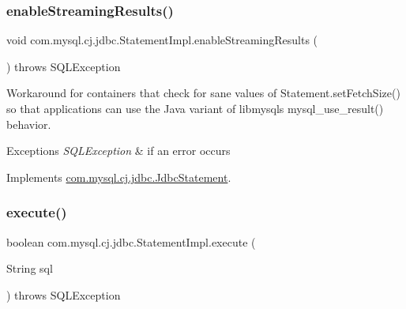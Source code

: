 \mbox{\label{classcom_1_1mysql_1_1cj_1_1jdbc_1_1_statement_impl_a973ff5045e258a5c3e156887c116c976}} 
\subsubsection{\texorpdfstring{enable\+Streaming\+Results()}{enableStreamingResults()}}
{\footnotesize\ttfamily void com.\+mysql.\+cj.\+jdbc.\+Statement\+Impl.\+enable\+Streaming\+Results (\begin{DoxyParamCaption}{ }\end{DoxyParamCaption}) throws S\+Q\+L\+Exception}

Workaround for containers that \textquotesingle{}check\textquotesingle{} for sane values of Statement.\+set\+Fetch\+Size() so that applications can use the Java variant of libmysql\textquotesingle{}s mysql\+\_\+use\+\_\+result() behavior.


\begin{DoxyExceptions}{Exceptions}
{\em S\+Q\+L\+Exception} & if an error occurs \\
\hline
\end{DoxyExceptions}


Implements \mbox{\hyperlink{interfacecom_1_1mysql_1_1cj_1_1jdbc_1_1_jdbc_statement_a35049f45e6278dc1b824812acbe75556}{com.\+mysql.\+cj.\+jdbc.\+Jdbc\+Statement}}.

\mbox{\label{classcom_1_1mysql_1_1cj_1_1jdbc_1_1_statement_impl_a55932ba2147827cc8b76353c14332c1f}} 
\subsubsection{\texorpdfstring{execute()}{execute()}\hspace{0.1cm}{\footnotesize\ttfamily [1/4]}}
{\footnotesize\ttfamily boolean com.\+mysql.\+cj.\+jdbc.\+Statement\+Impl.\+execute (\begin{DoxyParamCaption}\item[{String}]{sql }\end{DoxyParamCaption}) throws S\+Q\+L\+Exception}

